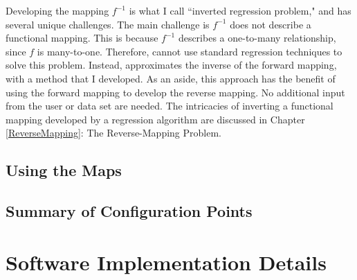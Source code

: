 Developing the mapping $f^{-1}$ is what I call ``inverted regression problem," and has several unique challenges.
The main challenge is $f^{-1}$ does not describe a functional mapping.
This is because $f^{-1}$ describes a one-to-many relationship, since $f$ is many-to-one.
Therefore, \fw cannot use standard regression techniques to solve this problem.
Instead, \fw approximates the inverse of the forward mapping, with a method that I developed.
As an aside, this approach has the benefit of using the forward mapping to develop the reverse mapping.
No additional input from the user or data set are needed.
The intricacies of inverting a functional mapping developed by a regression algorithm are discussed in Chapter \ref{ReverseMapping}: The Reverse-Mapping Problem.

\subsection{Using the Maps}




\subsection{Summary of Configuration Points}

\section{Software Implementation Details}


